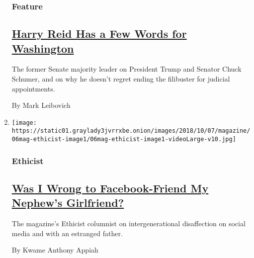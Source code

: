\begin{enumerate}
  \hypertarget{feature-2}{%
  \subsubsection{Feature}\label{feature-2}}

  \hypertarget{harry-reid-has-a-few-words-for-washington}{%
  \subsection{\texorpdfstring{\href{/2019/01/02/magazine/harry-reid-senate-cancer-trump.html}{Harry
  Reid Has a Few Words for
  Washington}}{Harry Reid Has a Few Words for Washington}}\label{harry-reid-has-a-few-words-for-washington}}

  The former Senate majority leader on President Trump and Senator Chuck
  Schumer, and on why he doesn't regret ending the filibuster for
  judicial appointments.

  By Mark Leibovich
\item
  \texttt{[image: https://static01.graylady3jvrrxbe.onion/images/2018/10/07/magazine/06mag-ethicist-image1/06mag-ethicist-image1-videoLarge-v10.jpg]}

  \hypertarget{ethicist}{%
  \subsubsection{Ethicist}\label{ethicist}}

  \hypertarget{was-i-wrong-to-facebook-friend-my-nephews-girlfriend}{%
  \subsection{\texorpdfstring{\href{/2019/01/02/magazine/was-i-wrong-to-facebook-friend-my-nephews-girlfriend.html}{Was
  I Wrong to Facebook-Friend My Nephew's
  Girlfriend?}}{Was I Wrong to Facebook-Friend My Nephew's Girlfriend?}}\label{was-i-wrong-to-facebook-friend-my-nephews-girlfriend}}

  The magazine's Ethicist columnist on intergenerational disaffection on
  social media and with an estranged father.

  By Kwame Anthony Appiah
\end{enumerate}

